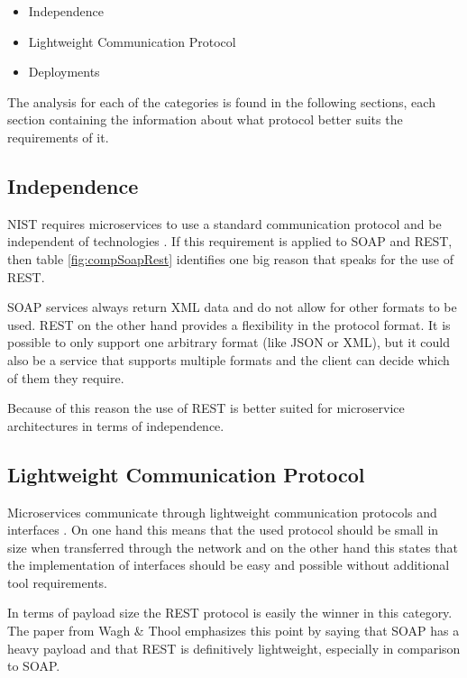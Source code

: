 \documentclass[conference]{IEEEtran}
\begin{document}
\begin{itemize}
	\item Independence
	\item Lightweight Communication Protocol
	\item Deployments
\end{itemize} 

The analysis for each of the categories is found in the following sections, each section containing the information about what protocol better suits the requirements of it.

\subsection{Independence}

NIST requires microservices to use a standard communication protocol and be independent of technologies \cite{karmel2016nist}. If this requirement is applied to SOAP and REST, then table \ref{fig:compSoapRest} identifies one big reason that speaks for the use of REST.

SOAP services always return XML data and do not allow for other formats to be used. REST on the other hand provides a flexibility in the protocol format. It is possible to only support one arbitrary format (like JSON or XML), but it could also be a service that supports multiple formats and the client can decide which of them they require.

Because of this reason the use of REST is better suited for microservice architectures in terms of independence.

\subsection{Lightweight Communication Protocol}

Microservices communicate through lightweight communication protocols and interfaces \cite{karmel2016nist}. On one hand this means that the used protocol should be small in size when transferred through the network and on the other hand this states that the implementation of interfaces should be easy and possible without additional tool requirements.

In terms of payload size the REST protocol is easily the winner in this category. The paper from Wagh \& Thool \cite{wagh2012comparative} emphasizes this point by saying that SOAP has a heavy payload and that REST is definitively lightweight, especially in comparison to SOAP.
\end{document}
